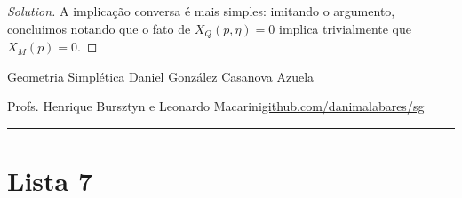 \begin{proof}[Solution]
A implicação conversa  é  mais simples: imitando o argumento, concluimos notando que o fato de $X_Q(p,\eta)=0$ implica trivialmente que $X_M(p)=0$.

\end{proof}

\clearpage\begin{minipage}{\textwidth}
	\begin{minipage}{1\textwidth}
		Geometria Simpl\'etica \hfill Daniel González Casanova Azuela
		
		{\small Profs. Henrique Bursztyn e Leonardo Macarini\hfill\href{https://github.com/danimalabares/sg}{github.com/danimalabares/sg}}
	\end{minipage}
\end{minipage}\vspace{.2cm}\hrule

\vspace{10pt}
\section{Lista 7}

\vspace{1em}


